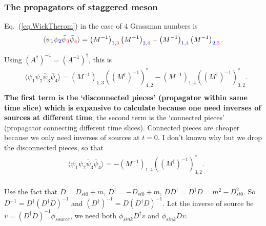 \subsubsection{\label{ThePropagatorsOfStaggeredMeson}The propagators of staggered meson}

Eq.~(\ref{eq.WickTherom}) in the case of $4$ Grassman numbers is
\begin{equation}
\begin{split}
&\langle \psi _{\textcolor[rgb]{0,0,1}{1}}\psi_{\textcolor[rgb]{0,0,1}{2}} \bar{\psi} _{\textcolor[rgb]{1,0,0}{3}} \bar{\psi}_{\textcolor[rgb]{1,0,0}{4}}\rangle = \left(M^{-1}\right)_{\textcolor[rgb]{0,0,1}{1},\textcolor[rgb]{1,0,0}{3}}\left(M^{-1}\right)_{\textcolor[rgb]{0,0,1}{2},\textcolor[rgb]{1,0,0}{4}}- \left(M^{-1}\right)_{\textcolor[rgb]{0,0,1}{1},\textcolor[rgb]{1,0,0}{4}}\left(M^{-1}\right)_{\textcolor[rgb]{0,0,1}{2},\textcolor[rgb]{1,0,0}{3}}.\\
\end{split}
\end{equation}

Using $(A^{\dagger})^{-1}=(A^{-1})^{\dagger}$, this is
\begin{equation}
\begin{split}
&\langle \psi _1\psi_2 \bar{\psi} _3 \bar{\psi}_4\rangle = \left(M^{-1}\right)_{1,3}\left((M^{\dagger})^{-1}\right)_{4,2}^*- \left(M^{-1}\right)_{1,4}\left((M^{\dagger})^{-1}\right)_{3,2}^*.\\
\end{split}
\end{equation}
\textcolor[rgb]{1,0,0}{\textbf{The first term is the `disconnected pieces' (propagator within same time slice) which is expansive to calculate because one need inverses of sources at different time}, the second term is the `connected pieces' (propagator connecting different time slices). Connected pieces are cheaper because we only need inverses of sources at $t=0$.} I don't known why but we drop the disconnected pieces, so that
\begin{equation}
\begin{split}
&\langle \psi _1\psi_2 \bar{\psi} _3 \bar{\psi}_4\rangle = - \left(M^{-1}\right)_{1,4}\left((M^{\dagger})^{-1}\right)_{3,2}^*.\\
\end{split}
\end{equation}

Use the fact that $D=D_{st0}+m$, $D^{\dagger}=-D_{st0}+m$, $DD^{\dagger}=D^{\dagger}D=m^2-D_{st0}^2$. So $D^{-1}=D^{\dagger} \left(D^{\dagger}D\right)^{-1}$ and $(D^{\dagger})^{-1}=D \left(D^{\dagger}D\right)^{-1}$. Let the inverse of source be $v=\left(D^{\dagger}D\right)^{-1} \phi _{source}$, we need both $\phi _{sink} D^{\dagger}v $ and $\phi _{sink} Dv$.

